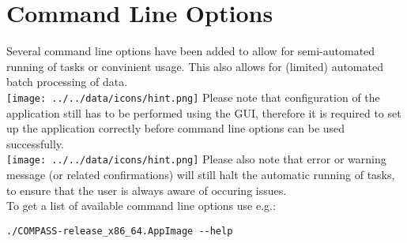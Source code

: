 \chapter{Command Line Options}
\label{sec:command_line} 

Several command line options have been added to allow for semi-automated running of tasks or convinient usage. This also allows for (limited) automated batch processing of data. \\

\texttt{[image: ../../data/icons/hint.png]} Please note that configuration of the application still has to be performed using the GUI, therefore it is required to set up the application correctly before command line options can be used successfully.\\

\texttt{[image: ../../data/icons/hint.png]} Please also note that error or warning message (or related confirmations) will still halt the automatic running of tasks, to ensure that the user is always aware of occuring issues. \\

To get a list of available command line options use e.g.:
\begin{lstlisting}
./COMPASS-release_x86_64.AppImage --help
\end{lstlisting}

